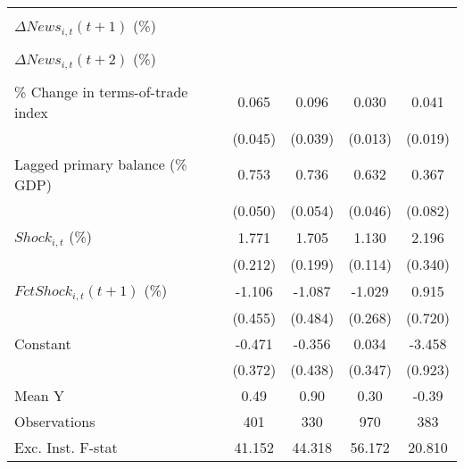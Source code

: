 {\begin{tabular}{l*{4}{c}}
                    &                     &                     &                     &                     \\
\addlinespace
$ \Delta News_{i,t}(t+1)$ (\%)&                     &                     &                     &                     \\
                    &                     &                     &                     &                     \\
\addlinespace
$ \Delta News_{i,t}(t+2)$ (\%)&                     &                     &                     &                     \\
                    &                     &                     &                     &                     \\
\addlinespace
\% Change in terms-of-trade index&       0.065         &       0.096\sym{**} &       0.030\sym{**} &       0.041\sym{**} \\
                    &     (0.045)         &     (0.039)         &     (0.013)         &     (0.019)         \\
\addlinespace
Lagged primary balance (\% GDP)&       0.753\sym{***}&       0.736\sym{***}&       0.632\sym{***}&       0.367\sym{***}\\
                    &     (0.050)         &     (0.054)         &     (0.046)         &     (0.082)         \\
\addlinespace
$ Shock_{i,t}$ (\%) &       1.771\sym{***}&       1.705\sym{***}&       1.130\sym{***}&       2.196\sym{***}\\
                    &     (0.212)         &     (0.199)         &     (0.114)         &     (0.340)         \\
\addlinespace
$ FctShock_{i,t}(t+1)$ (\%)&      -1.106\sym{**} &      -1.087\sym{**} &      -1.029\sym{***}&       0.915         \\
                    &     (0.455)         &     (0.484)         &     (0.268)         &     (0.720)         \\
\addlinespace
Constant            &      -0.471         &      -0.356         &       0.034         &      -3.458\sym{***}\\
                    &     (0.372)         &     (0.438)         &     (0.347)         &     (0.923)         \\
\midrule
Mean Y              &        0.49         &        0.90         &        0.30         &       -0.39         \\
Observations        &         401         &         330         &         970         &         383         \\
Exc. Inst. F-stat   &      41.152         &      44.318         &      56.172         &      20.810         \\
\bottomrule
\end{tabular}
}
